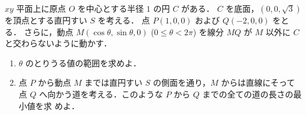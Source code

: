 \documentclass[a4paper,10pt]{ltjsarticle}
\begin{document}
\begin{oframed}
  $xy$ 平面上に原点 $O$ を中心とする半径 $1$ の円 $C$ がある．
  $C$ を底面，$(0,0,\sqrt{3})$ を頂点とする直円すい $S$ を考える．
  点 $P(1,0,0)$ および $Q(-2,0,0)$ をとる．
  さらに，動点 $M(\cos\theta,\sin\theta,0)$ ($0 \leq \theta < 2\pi$) を線分 $MQ$ が $M$ 以外に $C$ と交わらないように動かす．

  \begin{enumerate}
    \item
          $\theta$ のとりうる値の範囲を求めよ．
    \item
          点 $P$ から動点 $M$ までは直円すい $S$ の側面を通り，$M$ からは直線にそって点 $Q$ へ向かう道を考える．このような $P$ から $Q$ までの全ての道の長さの最小値を求 めよ．
  \end{enumerate}
\end{oframed}
\end{document}
